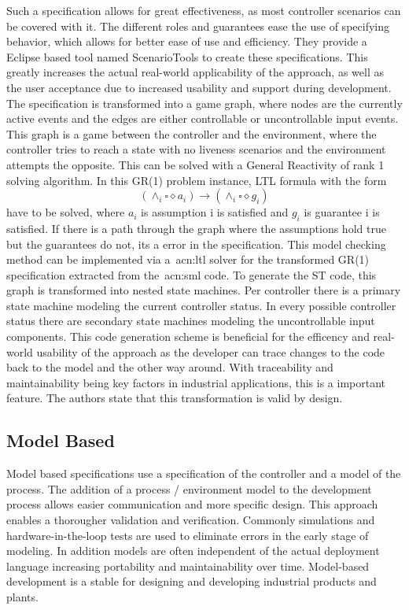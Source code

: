 Such a specification allows for great effectiveness, as most controller scenarios can be covered with it.
The different roles and guarantees ease the use of specifying behavior, which allows for better ease of use and efficiency.
They provide a Eclipse based tool named ScenarioTools to create these specifications.
This greatly increases the actual real-world applicability of the approach, as well as the user acceptance due to increased usability and support during development.
The specification is transformed into a game graph, where nodes are the currently active events and the edges are either controllable or uncontrollable input events.
This graph is a game between the controller and the environment, where the controller tries to reach a state with no liveness scenarios and the environment attempts the opposite.
This can be solved with a General Reactivity of rank 1 solving algorithm.
In this GR(1) problem instance, LTL formula with the form
\begin{equation}
\left(\land_{i}\square\diamond a_{i} \right) \rightarrow \left(\land_{i}\square\diamond g_{i} \right)
\end{equation}
have to be solved, where $a_{i}$ is assumption i is satisfied and $g_{i}$ is guarantee i is satisfied.
If there is a path through the graph where the assumptions hold true but the guarantees do not, its a error in the specification.
This model checking method can be implemented via a~\acrshort{acn:ltl} solver for the transformed GR(1) specification extracted from the~\acrshort{acn:sml} code.
To generate the ST code, this graph is transformed into nested state machines.
Per controller there is a primary state machine modeling the current controller status.
In every possible controller status there are secondary state machines modeling the uncontrollable input components.
This code generation scheme is beneficial for the efficency and real-world usability of the approach as the developer can trace changes to the code back to the model and the other way around.
With traceability and maintainability being key factors in industrial applications, this is a important feature.
The authors state that this transformation is valid by design.


\subsection{Model Based}
\label{sec:sub:mb}

Model based specifications use a specification of the controller and a model of the process.
The addition of a process / environment model to the development process allows easier communication and more specific design.
This approach enables a thorougher validation and verification.
Commonly simulations and hardware-in-the-loop tests are used to eliminate errors in the early stage of modeling.
In addition models are often independent of the actual deployment language increasing portability and maintainability over time.
Model-based development is a stable for designing and developing industrial products and plants.

